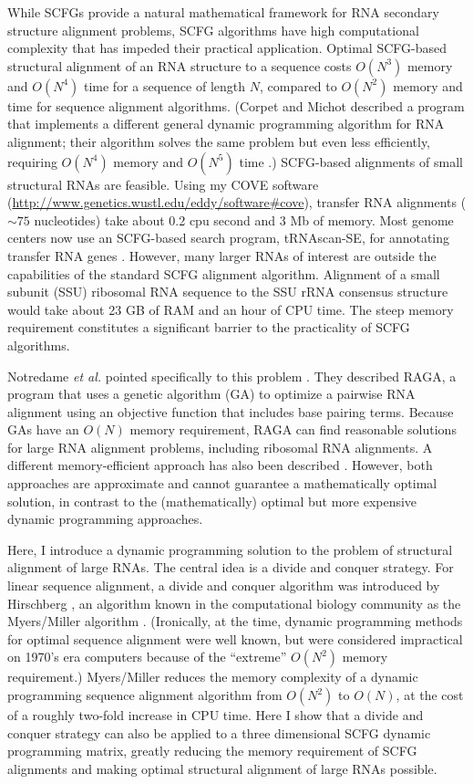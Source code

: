 \documentclass[11pt]{article}
\begin{document}
While SCFGs provide a natural mathematical framework for RNA secondary
structure alignment problems, SCFG algorithms have high computational
complexity that has impeded their practical application. Optimal
SCFG-based structural alignment of an RNA structure to a sequence
costs $O(N^3)$ memory and $O(N^4)$ time for a sequence of length $N$,
compared to $O(N^2)$ memory and time for sequence alignment
algorithms. (Corpet and Michot described a program that implements a
different general dynamic programming algorithm for RNA alignment;
their algorithm solves the same problem but even less efficiently,
requiring $O(N^4)$ memory and $O(N^5)$ time \cite{Corpet94}.)
SCFG-based alignments of small structural RNAs are feasible. Using my
COVE software
(\url{http://www.genetics.wustl.edu/eddy/software#cove}), transfer RNA
alignments ($\sim 75$ nucleotides) take about 0.2 cpu second and 3 Mb
of memory. Most genome centers now use an SCFG-based search program,
tRNAscan-SE, for annotating transfer RNA genes
\cite{LoweEddy97}. However, many larger RNAs of interest are outside
the capabilities of the standard SCFG alignment algorithm. Alignment
of a small subunit (SSU) ribosomal RNA sequence to the SSU rRNA
consensus structure would take about 23 GB of RAM and an hour of CPU
time. The steep memory requirement constitutes a significant barrier
to the practicality of SCFG algorithms.

Notredame \emph{et al.} pointed specifically to this problem
\cite{Notredame97}.  They described RAGA, a program that uses a
genetic algorithm (GA) to optimize a pairwise RNA alignment using an
objective function that includes base pairing terms. Because GAs have
an $O(N)$ memory requirement, RAGA can find reasonable solutions for
large RNA alignment problems, including ribosomal RNA alignments. A
different memory-efficient approach has also been described
\cite{Lenhof98,LenhofVingron98}. However, both approaches are
approximate and cannot guarantee a mathematically optimal solution, in
contrast to the (mathematically) optimal but more expensive dynamic
programming approaches.

Here, I introduce a dynamic programming solution to the problem of
structural alignment of large RNAs. The central idea is a divide and
conquer strategy. For linear sequence alignment, a divide and conquer
algorithm was introduced by Hirschberg \cite{Hirschberg75}, an
algorithm known in the computational biology community as the
Myers/Miller algorithm \cite{MyM-88a}. (Ironically, at the time,
dynamic programming methods for optimal sequence alignment were well
known, but were considered impractical on 1970's era computers because
of the ``extreme'' $O(N^2)$ memory requirement.) Myers/Miller reduces
the memory complexity of a dynamic programming sequence alignment
algorithm from $O(N^2)$ to $O(N)$, at the cost of a roughly two-fold
increase in CPU time. Here I show that a divide and conquer strategy
can also be applied to a three dimensional SCFG dynamic programming
matrix, greatly reducing the memory requirement of SCFG alignments and
making optimal structural alignment of large RNAs possible.
\end{document}
